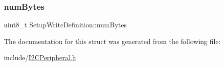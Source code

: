 \mbox{\label{struct_setup_write_definition_ac106abf7ef3fbc971150c5ed427a8761}} 
\subsubsection{\texorpdfstring{num\+Bytes}{numBytes}}
{\footnotesize\ttfamily uint8\+\_\+t Setup\+Write\+Definition\+::num\+Bytes}



The documentation for this struct was generated from the following file\+:\begin{DoxyCompactItemize}
\item 
include/\mbox{\hyperlink{_i2_c_peripheral_8h}{I2\+C\+Peripheral.\+h}}\end{DoxyCompactItemize}
